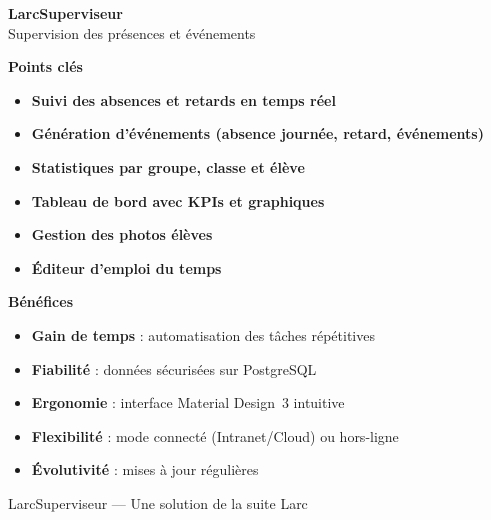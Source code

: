 \documentclass[11pt,a4paper]{article}
\newcommand{\larcsection}[1]{
  \vspace{1em}
  {\color{larcblue}\Large\textbf{#1}}
  \vspace{0.5em}
}
\begin{document}
\thispagestyle{empty}

\begin{center}
  {\Huge\color{larcblue}\textbf{LarcSuperviseur}}\\[0.3cm]
  {\Large Supervision des présences et événements}
\end{center}

\vspace{0.8cm}

\begin{center}
\end{center}

\larcsection{Points clés}

\begin{itemize}
  \item \textbf{Suivi des absences et retards en temps réel}
  \item \textbf{Génération d'événements (absence journée, retard, événements)}
  \item \textbf{Statistiques par groupe, classe et élève}
  \item \textbf{Tableau de bord avec KPIs et graphiques}
  \item \textbf{Gestion des photos élèves}
  \item \textbf{Éditeur d'emploi du temps}
\end{itemize}

\larcsection{Bénéfices}

\begin{itemize}
  \item \textbf{Gain de temps} : automatisation des tâches répétitives
  \item \textbf{Fiabilité} : données sécurisées sur PostgreSQL
  \item \textbf{Ergonomie} : interface Material Design~3 intuitive
  \item \textbf{Flexibilité} : mode connecté (Intranet/Cloud) ou hors-ligne
  \item \textbf{Évolutivité} : mises à jour régulières
\end{itemize}

\vspace{1.5cm}

\begin{center}
\end{center}

\vfill

\begin{center}
  {\footnotesize\color{gray} LarcSuperviseur — Une solution de la suite Larc}
\end{center}
\end{document}

